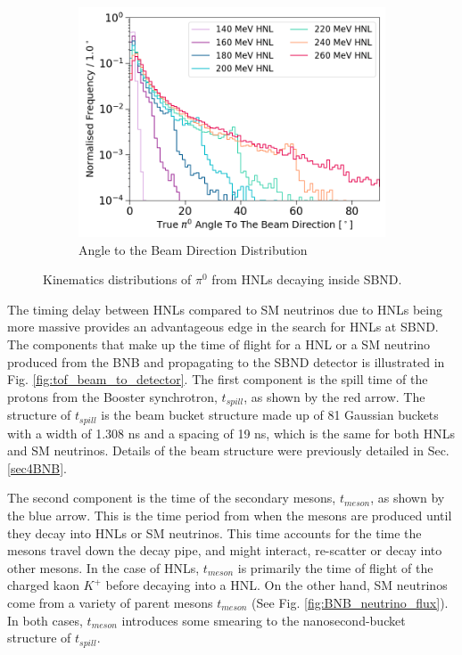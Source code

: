 \begin{figure}[t!]
\begin{subfigure}[b]{0.495\textwidth}
            \includegraphics[width=\textwidth]{pi0_angle2Beam}
            \caption{Angle to the Beam Direction Distribution}%
        \end{subfigure}
        \caption[Kinematics Distributions of Neutral Pions From HNLs]{Kinematics distributions of $\pi^0$ from HNLs decaying inside SBND.}
        \label{fig:pi0_distribution}
\end{figure}

The timing delay between HNLs compared to SM neutrinos due to HNLs being more massive provides an advantageous edge in the search for HNLs at SBND. 
The components that make up the time of flight for a HNL or a SM neutrino produced from the BNB and propagating to the SBND detector is illustrated in Fig. \ref{fig:tof_beam_to_detector}.
The first component is the spill time of the protons from the Booster synchrotron, $t_{spill}$, as shown by the red arrow.
The structure of $t_{spill}$ is the beam bucket structure made up of 81 Gaussian buckets with a width of 1.308 ns and a spacing of 19 ns, which is the same for both HNLs and SM neutrinos.
Details of the beam structure were previously detailed in Sec. \ref{sec4BNB}.   

The second component is the time of the secondary mesons, $t_{meson}$, as shown by the blue arrow.
This is the time period from when the mesons are produced until they decay into HNLs or SM neutrinos.
This time accounts for the time the mesons travel down the decay pipe, and might interact, re-scatter or decay into other mesons.
In the case of HNLs, $t_{meson}$ is primarily the time of flight of the charged kaon $K^+$ before decaying into a HNL.
On the other hand, SM neutrinos come from a variety of parent mesons $t_{meson}$ (See Fig. \ref{fig:BNB_neutrino_flux}).
In both cases, $t_{meson}$ introduces some smearing to the nanosecond-bucket structure of $t_{spill}$.

